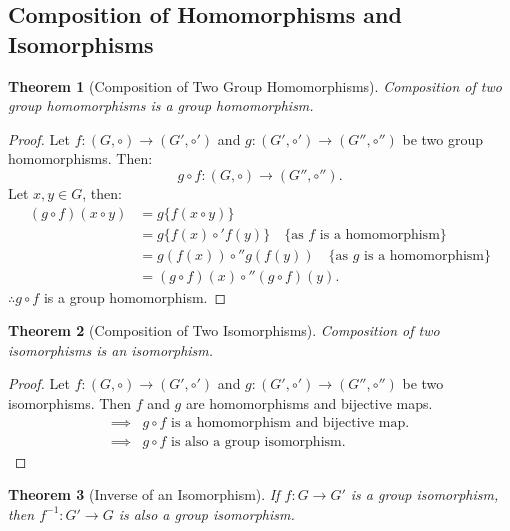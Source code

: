\documentclass[12pt]{article}
\theoremstyle{definition}
\theoremstyle{plain}
\newtheorem{theorem}{Theorem}[section]
\begin{document}
\subsection{Composition of Homomorphisms and Isomorphisms}

\begin{theorem}[Composition of Two Group Homomorphisms]
Composition of two group homomorphisms is a group homomorphism.
\end{theorem}

\begin{proof}
Let $f: (G, \circ) \longrightarrow (G', \circ')$ and $g: (G', \circ') \longrightarrow (G'', \circ'')$ be two group homomorphisms.
Then:
\[
g \circ f: (G, \circ) \longrightarrow (G'', \circ'').
\]
Let $x, y \in G$, then:
\begin{align*}
(g \circ f)(x \circ y) &= g\{f(x \circ y)\} \\
&= g\{f(x) \circ' f(y)\} \quad \{\text{as } f \text{ is a homomorphism}\} \\
&= g(f(x)) \circ'' g(f(y)) \quad \{\text{as } g \text{ is a homomorphism}\} \\
&= (g \circ f)(x) \circ'' (g \circ f)(y).
\end{align*}
$\therefore g \circ f$ is a group homomorphism.
\end{proof}

\begin{theorem}[Composition of Two Isomorphisms]
Composition of two isomorphisms is an isomorphism.
\end{theorem}

\begin{proof}
Let $f: (G, \circ) \longrightarrow (G', \circ')$ and $g: (G', \circ') \longrightarrow (G'', \circ'')$ be two isomorphisms.
Then $f$ and $g$ are homomorphisms and bijective maps.
\begin{align*}
\implies & g \circ f \text{ is a homomorphism and bijective map.} \\
\implies & g \circ f \text{ is also a group isomorphism.}
\end{align*}
\end{proof}

\begin{theorem}[Inverse of an Isomorphism]
If $f: G \longrightarrow G'$ is a group isomorphism, then $f^{-1}: G' \longrightarrow G$ is also a group isomorphism.
\end{theorem}
\end{document}
